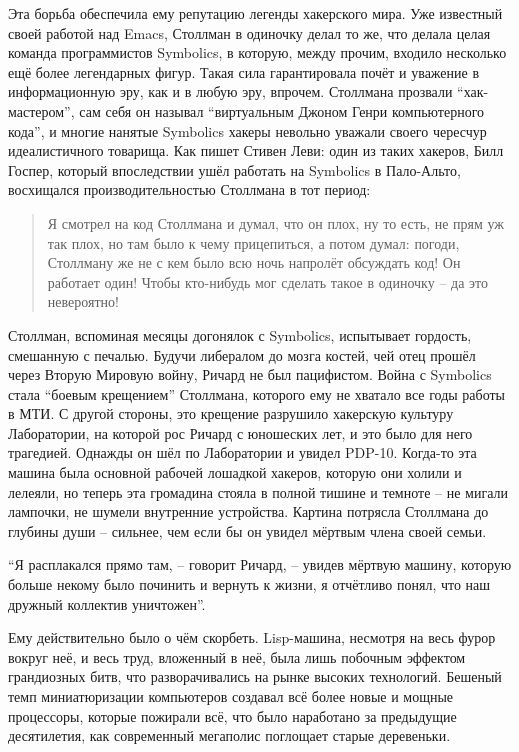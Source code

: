 Эта борьба обеспечила ему репутацию легенды хакерского мира. Уже известный своей работой над Emacs, Столлман в одиночку делал то же, что делала целая команда программистов Symbolics, в которую, между прочим, входило несколько ещё более легендарных фигур. Такая сила гарантировала почёт и уважение в информационную эру, как и в любую эру, впрочем. Столлмана прозвали \enquote{хак-мастером}, сам себя он называл \enquote{виртуальным Джоном Генри компьютерного кода}, и многие нанятые Symbolics хакеры невольно уважали своего чересчур идеалистичного товарища. Как пишет Стивен Леви: один из таких хакеров, Билл Госпер, который впоследствии ушёл работать на Symbolics в Пало-Альто, восхищался производительностью Столлмана в тот период:

\begin{quote}
Я смотрел на код Столлмана и думал, что он плох, ну то есть, не прям уж так плох, но там было к чему прицепиться, а потом думал: погоди, Столлману же не с кем было всю ночь напролёт обсуждать код! Он работает один! Чтобы кто-нибудь мог сделать такое в одиночку -- да это невероятно!
\end{quote}

Столлман, вспоминая месяцы догонялок с Symbolics, испытывает гордость, смешанную с печалью. Будучи либералом до мозга костей, чей отец прошёл через Вторую Мировую войну, Ричард не был пацифистом. Война с Symbolics стала \enquote{боевым крещением} Столлмана, которого ему не хватало все годы работы в МТИ. С другой стороны, это крещение разрушило хакерскую культуру Лаборатории, на которой рос Ричард с юношеских лет, и это было для него трагедией. Однажды он шёл по Лаборатории и увидел PDP-10. Когда-то эта машина была основной рабочей лошадкой хакеров, которую они холили и лелеяли, но теперь эта громадина стояла в полной тишине и темноте -- не мигали лампочки, не шумели внутренние устройства. Картина потрясла Столлмана до глубины души -- сильнее, чем если бы он увидел мёртвым члена своей семьи.

\enquote{Я расплакался прямо там, -- говорит Ричард, -- увидев мёртвую машину, которую больше некому было починить и вернуть к жизни, я отчётливо понял, что наш дружный коллектив уничтожен}.

Ему действительно было о чём скорбеть. Lisp-машина, несмотря на весь фурор вокруг неё, и весь труд, вложенный в неё, была лишь побочным эффектом грандиозных битв, что разворачивались на рынке высоких технологий. Бешеный темп миниатюризации компьютеров создавал всё более новые и мощные процессоры, которые пожирали всё, что было наработано за предыдущие десятилетия, как современный мегаполис поглощает старые деревеньки.


